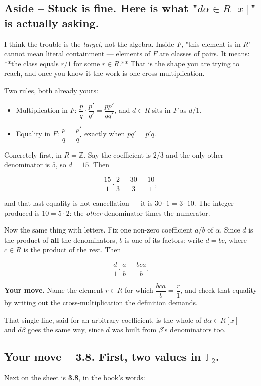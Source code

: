 \documentclass[11pt]{article}
\begin{document}
\subsection*{Aside -- Stuck is fine. Here is what "$d\alpha \in R[x]$" is actually asking.}
I think the trouble is the \emph{target}, not the algebra. Inside $F$, "this element is in $R$" cannot mean literal containment --- elements of $F$ are classes of pairs. It means: **the class equals $r/1$ for some $r \in R$.** That is the shape you are trying to reach, and once you know it the work is one cross-multiplication.

Two rules, both already yours:

\begin{itemize}
  \item Multiplication in $F$: $\dfrac{p}{q}\cdot\dfrac{p'}{q'} = \dfrac{pp'}{qq'}$, and $d \in R$ sits in $F$ as $d/1$.
  \item Equality in $F$: $\dfrac{p}{q} = \dfrac{p'}{q'}$ exactly when $pq' = p'q$.
\end{itemize}

Concretely first, in $R = \mathbb{Z}$. Say the coefficient is $2/3$ and the only other denominator is $5$, so $d = 15$. Then

$$\frac{15}{1}\cdot\frac{2}{3} = \frac{30}{3} = \frac{10}{1},$$

and that last equality is not cancellation --- it is $30 \cdot 1 = 3 \cdot 10$. The integer produced is $10 = 5 \cdot 2$: the \emph{other} denominator times the numerator.

Now the same thing with letters. Fix one non-zero coefficient $a/b$ of $\alpha$. Since $d$ is the product of \textbf{all} the denominators, $b$ is one of its factors: write $d = bc$, where $c \in R$ is the product of the rest. Then

$$\frac{d}{1}\cdot\frac{a}{b} = \frac{bca}{b}.$$

\textbf{Your move.} Name the element $r \in R$ for which $\dfrac{bca}{b} = \dfrac{r}{1}$, and check that equality by writing out the cross-multiplication the definition demands.

That single line, said for an arbitrary coefficient, is the whole of $d\alpha \in R[x]$ --- and $d\beta$ goes the same way, since $d$ was built from $\beta$'s denominators too.


\subsection*{Your move -- 3.8. First, two values in $\mathbb{F}_2$.}
Next on the sheet is \textbf{3.8}, in the book's words:
\end{document}
